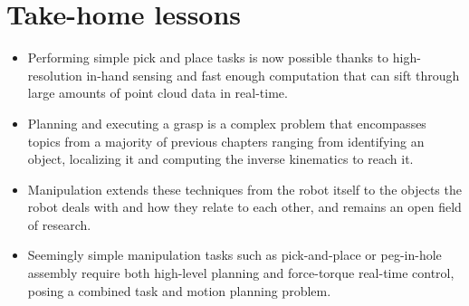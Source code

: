 \section*{Take-home lessons}
\begin{itemize}
\item Performing simple pick and place tasks is now possible thanks to high-resolution in-hand sensing and fast enough computation that can sift through large amounts of point cloud data in real-time. 
\item Planning and executing a grasp is a complex problem that encompasses topics from a majority of previous chapters ranging from identifying an object, localizing it and computing the inverse kinematics to reach it.
\item Manipulation extends these techniques from the robot itself to the objects the robot deals with and how they relate to each other, and remains an open field of research. 
\item Seemingly simple manipulation tasks such as pick-and-place or peg-in-hole assembly require both high-level planning and force-torque real-time control, posing a combined task and motion planning problem. 
\end{itemize}

